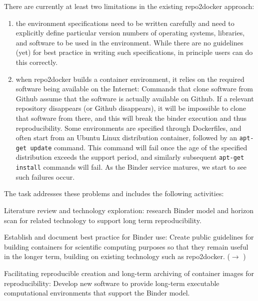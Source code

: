 \begin{task}[
  title=Archiving software environments for reproducible computation,
  id=reproducibility,
  lead=XFEL,
  PM=36,
  wphases={1-36},
  partners={XFEL,WTT,SRL,UPSUD,QS}
]
  There are currently at least two limitations in the existing
  repo2docker approach:
\begin{enumerate}
\item the environment specifications need to be written carefully and
  need to explicitly define particular version numbers of operating
  systems, libraries, and software to be used in the
  environment. While there are no guidelines (yet) for best practice
  in writing such specifications, in principle users can do this
  correctly.
\item when repo2docker builds a container environment, it relies on
  the required software being available on the Internet: Commands that
  clone software from Github assume that the software is actually
  available on Github. If a relevant repository disappears (or Github
  disappears), it will be impossible to clone that software from
  there, and this will break the binder execution and thus
  reproducibility. Some environments are specified through
  Dockerfiles, and often start from an Ubuntu Linux distribution
  container, followed by an \texttt{apt-get update} command. This
  command will fail once the age of the specified distribution exceeds
  the support period, and similarly subsequent \texttt{apt-get
    install} commands will fail. As the Binder service matures, we
  start to see such failures occur.
\end{enumerate}

The task addresses these problems and includes the following activities:
\begin{compactitem}

\item Literature review and technology exploration: research Binder
  model and horizon scan for related technology to support long term
  reproducibility.

\item Establish and document best practice for Binder use: Create
  public guidelines for building containers for scientific computing
  purposes so that they remain useful in the longer term, building on
  existing technology such as repo2docker. ($\rightarrow$
  )

\item Facilitating reproducible creation and long-term archiving of
  container images for reproducibility: Develop new software to
  provide long-term executable computational environments that support
  the Binder model.


\end{compactitem}
\end{task}
